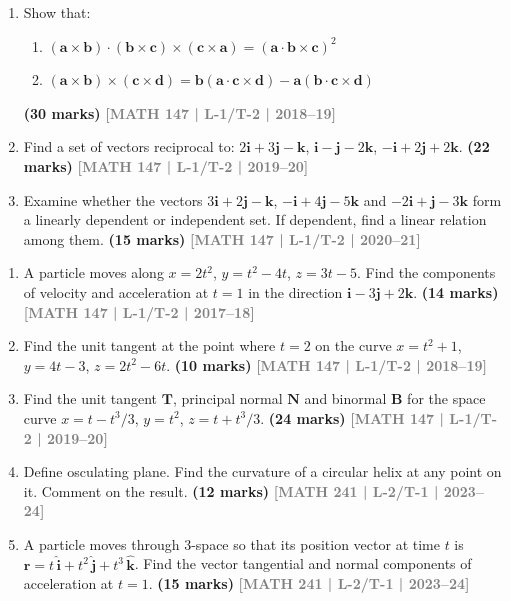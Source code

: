 \documentclass[12pt,a4paper]{article}
\newcommand{\yr}[1]{\hfill\textcolor{gray}{\small\textbf{[#1]}}}
\newcommand{\mk}[1]{\textcolor{orange!70!black}{\small\textbf{(#1 marks)}}}
\begin{document}
\begin{enumerate}
\item Show that:
\begin{enumerate}
  \item $(\mathbf{a}\times\mathbf{b})\cdot(\mathbf{b}\times\mathbf{c})\times(\mathbf{c}\times\mathbf{a})=(\mathbf{a}\cdot\mathbf{b}\times\mathbf{c})^{2}$
  \item $(\mathbf{a}\times\mathbf{b})\times(\mathbf{c}\times\mathbf{d})=\mathbf{b}(\mathbf{a}\cdot\mathbf{c}\times\mathbf{d})-\mathbf{a}(\mathbf{b}\cdot\mathbf{c}\times\mathbf{d})$
\end{enumerate}
\mk{30} \yr{MATH 147 | L-1/T-2 | 2018--19}

\item Find a set of vectors reciprocal to: $2\mathbf{i}+3\mathbf{j}-\mathbf{k}$, $\mathbf{i}-\mathbf{j}-2\mathbf{k}$, $-\mathbf{i}+2\mathbf{j}+2\mathbf{k}$.
\mk{22} \yr{MATH 147 | L-1/T-2 | 2019--20}

\item Examine whether the vectors $3\mathbf{i}+2\mathbf{j}-\mathbf{k}$, $-\mathbf{i}+4\mathbf{j}-5\mathbf{k}$ and $-2\mathbf{i}+\mathbf{j}-3\mathbf{k}$ form a linearly dependent or independent set. If dependent, find a linear relation among them.
\mk{15} \yr{MATH 147 | L-1/T-2 | 2020--21}

\end{enumerate}

\begin{enumerate}

\item A particle moves along $x=2t^{2}$, $y=t^{2}-4t$, $z=3t-5$. Find the components of velocity and acceleration at $t=1$ in the direction $\mathbf{i}-3\mathbf{j}+2\mathbf{k}$.
\mk{14} \yr{MATH 147 | L-1/T-2 | 2017--18}

\item Find the unit tangent at the point where $t=2$ on the curve $x=t^{2}+1$, $y=4t-3$, $z=2t^{2}-6t$.
\mk{10} \yr{MATH 147 | L-1/T-2 | 2018--19}

\item Find the unit tangent $\mathbf{T}$, principal normal $\mathbf{N}$ and binormal $\mathbf{B}$ for the space curve $x=t-t^{3}/3$, $y=t^{2}$, $z=t+t^{3}/3$.
\mk{24} \yr{MATH 147 | L-1/T-2 | 2019--20}

\item Define osculating plane. Find the curvature of a circular helix at any point on it. Comment on the result.
\mk{12} \yr{MATH 241 | L-2/T-1 | 2023--24}

\item A particle moves through 3-space so that its position vector at time $t$ is $\mathbf{r}=t\,\hat{\mathbf{i}}+t^{2}\,\hat{\mathbf{j}}+t^{3}\,\hat{\mathbf{k}}$. Find the vector tangential and normal components of acceleration at $t=1$.
\mk{15} \yr{MATH 241 | L-2/T-1 | 2023--24}

\end{enumerate}
\end{document}
